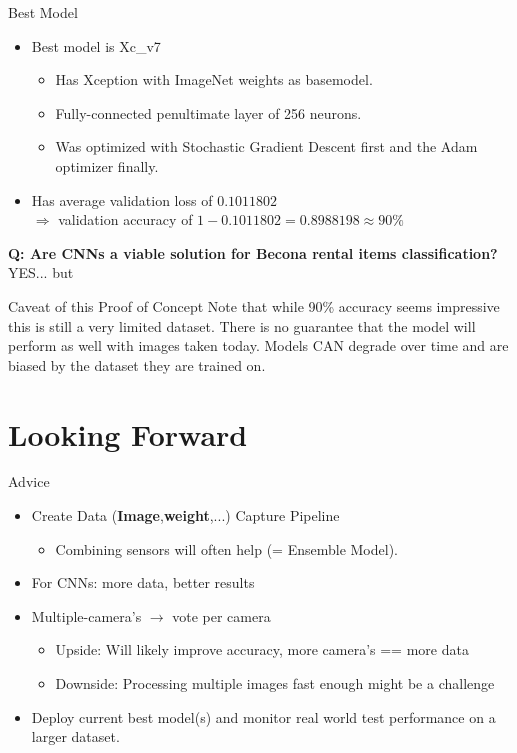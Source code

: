 \documentclass{beamer}
\begin{document}
\begin{frame}{Best Model}
\begin{itemize}
 \item Best model is Xc\_v7
  \begin{itemize}
    \item Has Xception with ImageNet weights as basemodel.
    \item Fully-connected penultimate layer of 256 neurons.
    \item Was optimized with Stochastic Gradient Descent first and the Adam optimizer finally. 
  \end{itemize}
 \item Has average validation loss of $0.1011802$ \\ $\Rightarrow$ validation accuracy of $ 1 - 0.1011802 = 0.8988198 \approx 90\%$
\end{itemize}
{\large \textbf{Q: Are CNNs a viable solution for Becona rental items classification?}}
{\huge YES... but}
\end{frame}

\begin{frame}{Caveat of this Proof of Concept}
Note that while 90\% accuracy seems impressive this is still a very limited dataset.
There is no guarantee that the model will perform as well with images taken today.
Models CAN degrade over time and are biased by the dataset they are trained on.
\end{frame}

\section{Looking Forward}
\begin{frame}{Advice}
\begin{itemize}
  \item Create Data (\textbf{Image},\textbf{weight},...) Capture Pipeline
  \begin{itemize}
  \item Combining sensors will often help (= Ensemble Model).
  \end{itemize}
  \item For CNNs: more data, better results
  \item Multiple-camera's $\rightarrow$ vote per camera
  \begin{itemize}
  \item Upside: Will likely improve accuracy, more camera's == more data
  \item Downside: Processing multiple images fast enough might be a challenge 
  \end{itemize}
  \item Deploy current best model(s) and monitor real world test performance on a larger dataset. 
\end{itemize}
\end{frame}
\end{document}
